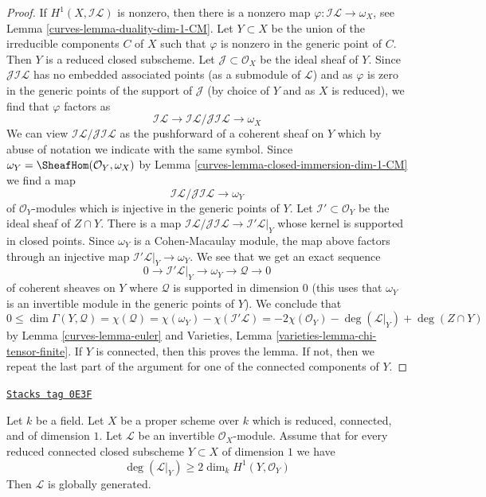 \begin{proof}

If $H^1(X, \mathcal{I}\mathcal{L})$ is nonzero, then there is a nonzero map
$\varphi : \mathcal{I}\mathcal{L} \to \omega_X$, see
Lemma \ref{curves-lemma-duality-dim-1-CM}. Let $Y \subset X$
be the union of the irreducible components $C$ of $X$ such that
$\varphi$ is nonzero in the generic point of $C$.
Then $Y$ is a reduced closed subscheme.
Let $\mathcal{J} \subset \mathcal{O}_X$ be the ideal sheaf of $Y$.
Since $\mathcal{J}\mathcal{I}\mathcal{L}$
has no embedded associated points
(as a submodule of $\mathcal{L}$) and as $\varphi$ is zero
in the generic points of the support of $\mathcal{J}$
(by choice of $Y$ and as $X$ is reduced), we find that
$\varphi$ factors as
$$
\mathcal{I}\mathcal{L} \to
\mathcal{I}\mathcal{L}/\mathcal{J}\mathcal{I}\mathcal{L} \to \omega_X
$$
We can view $\mathcal{I}\mathcal{L}/\mathcal{J}\mathcal{I}\mathcal{L}$
as the pushforward of a coherent sheaf on $Y$ which by abuse of
notation we indicate with the same symbol.
Since $\omega_Y = \SheafHom(\mathcal{O}_Y, \omega_X)$
by Lemma \ref{curves-lemma-closed-immersion-dim-1-CM}
we find a map
$$
\mathcal{I}\mathcal{L}/
\mathcal{J}\mathcal{I}\mathcal{L}
\to \omega_Y
$$
of $\mathcal{O}_Y$-modules which is injective in the generic points
of $Y$. Let $\mathcal{I}' \subset \mathcal{O}_Y$ be the ideal
sheaf of $Z \cap Y$. There is a map
$\mathcal{I}\mathcal{L}/\mathcal{J}\mathcal{I}\mathcal{L} \to
\mathcal{I}'\mathcal{L}|_Y$ whose kernel is supported in closed points.
Since $\omega_Y$ is a Cohen-Macaulay module, the map above
factors through an injective map $\mathcal{I}'\mathcal{L}|_Y \to
\omega_Y$. We see that we get
an exact sequence
$$
0 \to \mathcal{I}'\mathcal{L}|_Y \to \omega_Y \to \mathcal{Q} \to 0
$$
of coherent sheaves on $Y$ where $\mathcal{Q}$ is supported in dimension $0$
(this uses that $\omega_Y$ is an invertible module in the generic points
of $Y$). We conclude that
$$
0 \leq \dim \Gamma(Y, \mathcal{Q}) =
\chi(\mathcal{Q}) = \chi(\omega_Y) - \chi(\mathcal{I}'\mathcal{L}) =
-2\chi(\mathcal{O}_Y) - \deg(\mathcal{L}|_Y) + \deg(Z \cap Y)
$$
by Lemma \ref{curves-lemma-euler} and
Varieties, Lemma \ref{varieties-lemma-chi-tensor-finite}.
If $Y$ is connected, then this proves the lemma.
If not, then we repeat the last part of the argument
for one of the connected components of $Y$.
\end{proof}

\begin{lemma}
\label{curves-lemma-global-generation}
\href{https://stacks.math.columbia.edu/tag/0E3F}{\texttt{Stacks tag 0E3F}}

Let $k$ be a field. Let $X$ be a proper scheme over $k$
which is reduced, connected, and of dimension $1$.
Let $\mathcal{L}$ be an invertible $\mathcal{O}_X$-module.
Assume that for every reduced connected closed subscheme
$Y \subset X$ of dimension $1$ we have
$$
\deg(\mathcal{L}|_Y) \geq 2\dim_k H^1(Y, \mathcal{O}_Y)
$$
Then $\mathcal{L}$ is globally generated.
\end{lemma}

